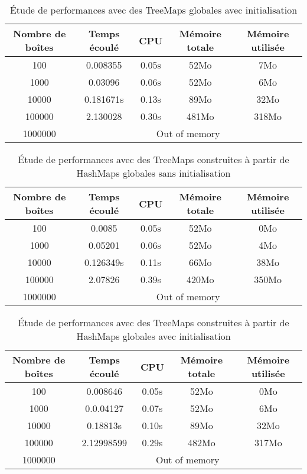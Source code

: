 \begin{table}[h]
  \centering
\begin{tabular}{|c|c|c|c|c|}
\hline
Nombre de boîtes & Temps écoulé & CPU & Mémoire totale & Mémoire utilisée\\
\hline
100 & 0.008355 & 0.05s & 52Mo & 7Mo\\
\hline
1000 & 0.03096 & 0.06s & 52Mo & 6Mo\\
\hline
10000 & 0.181671s & 0.13s & 89Mo & 32Mo\\
\hline
100000 & 2.130028 & 0.30s & 481Mo & 318Mo\\
\hline
1000000 & \multicolumn{4}{|c|}{Out of memory}\\
\hline
\end{tabular}
\caption{Étude de performances avec des TreeMaps globales avec initialisation}
\label{tab:treemapglobalInit}
\end{table}



\begin{table}[h]
  \centering
\begin{tabular}{|c|c|c|c|c|}
\hline
Nombre de boîtes & Temps écoulé & CPU & Mémoire totale & Mémoire utilisée\\
\hline
100 & 0.0085 & 0.05s & 52Mo & 0Mo\\
\hline
1000 & 0.05201 & 0.06s & 52Mo & 4Mo\\
\hline
10000 & 0.126349s & 0.11s & 66Mo & 38Mo\\
\hline
100000 & 2.07826 & 0.39s & 420Mo & 350Mo\\
\hline
1000000 & \multicolumn{4}{|c|}{Out of memory}\\
\hline
\end{tabular}
\caption{Étude de performances avec des TreeMaps construites à partir de HashMaps globales sans initialisation} 
\label{tab:treehashmapglobal}
\end{table}

\begin{table}[h]
  \centering
\begin{tabular}{|c|c|c|c|c|}
\hline
Nombre de boîtes & Temps écoulé & CPU & Mémoire totale & Mémoire utilisée\\
\hline
100 & 0.008646 & 0.05s & 52Mo & 0Mo\\
\hline
1000 & 0.0.04127 & 0.07s & 52Mo & 6Mo\\
\hline
10000 & 0.18813s & 0.10s & 89Mo & 32Mo\\
\hline
100000 & 2.12998599 & 0.29s & 482Mo & 317Mo\\
\hline
1000000 & \multicolumn{4}{|c|}{Out of memory}\\
\hline
\end{tabular}
\caption{Étude de performances avec des TreeMaps construites à partir de HashMaps globales avec initialisation} 
\label{tab:treehashmapglobalInit}
\end{table}
